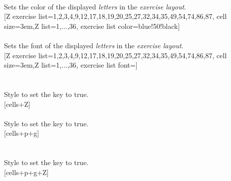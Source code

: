 \\ [5pt]\pgfPTendoption%
%
{Sets the color of the displayed \textit{letters} in the \textit{exercise layout}.
}%
\\ [5pt][Z exercise list={1,2,3,4,9,12,17,18,19,20,25,27,32,34,35,49,54,74,86,87}, cell size=3em,Z list={1,...,36},
exercise list color=blue!50!black]%
\\ [10pt]\makebox[\linewidth][c]{\scalebox{.6}{\pgfPT[cell size=3em,Z list={1,...,36},%
Z exercise list={1,2,3,4,9,12,17,18,19,20,25,27,32,34,35,49,54,74,86,87},exercise list color=blue!50!black]}}%
\\ [5pt]\pgfPTendoption%
%
{Sets the font of the displayed \textit{letters} in the \textit{exercise layout}.
}%
\\ [5pt][Z exercise list={1,2,3,4,9,12,17,18,19,20,25,27,32,34,35,49,54,74,86,87}, cell size=3em,Z list={1,...,36},
exercise list font=\string{}\string\selectfont]%
\\ [10pt]\makebox[\linewidth][c]{\scalebox{.6}{\pgfPT[cell size=3em,Z list={1,...,36},%
Z exercise list={1,2,3,4,9,12,17,18,19,20,25,27,32,34,35,49,54,74,86,87},exercise list font=\fontfamily{fmm}\selectfont]}}%
\\ [5pt]\pgfPTendoption%
\newpage\ \\ [-25pt]%
%
{Style to set the key  to true.
}%
\\ [5pt][cells+Z]%
\\ [10pt]\makebox[\linewidth][c]{\scalebox{.6}{\pgfPT[cells+Z]}}%
\\ [5pt]\pgfPTendstyle%
\vfill%
%
{Style to set the key  to true.
}%
\\ [5pt][cells+p+g]%
\\ [10pt]\makebox[\linewidth][c]{\scalebox{.6}{\pgfPT[cells+p+g]}}%
\\ [5pt]\pgfPTendstyle%
\newpage\ \\ [-25pt]%
%
{Style to set the key  to true.
}%
\\ [5pt][cells+p+g+Z]%
